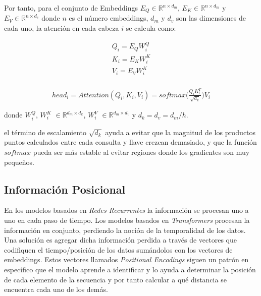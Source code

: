 Por tanto, para el conjunto de Embeddings  $E_Q \in \mathbb{R}^{n \times d_m}$,
$E_K \in \mathbb{R}^{n \times d_m}$ y $E_V \in \mathbb{R}^{n \times d_v}$ donde $n$ es el número
embeddings, $d_m$ y $d_v$ son las dimensiones de cada uno, la atención en cada cabeza $i$ se calcula
como:

\begin{equation}
    \begin{split}
        Q_i = E_Q W_i^Q\\
        K_i = E_K W_i^K\\
        V_i = E_V W_i^K\\
    \end{split}
\end{equation}

\begin{equation}
\begin{split}
    head_i = Attention(Q_i, K_i, V_i) = softmax\Big(\frac{Q_i K_i^T}{\sqrt{d_k}}\Big) V_i
    \label{eq:trans_att}
\end{split}
\end{equation}

donde $W_i^Q$, $W_i^K$ $\in \mathbb{R}^{d_m \times d_k}$, $W_i^V$ $\in \mathbb{R}^{d_m \times d_v}$
y $d_k=d_v=d_m/h$.

el término de escalamiento $\sqrt{d_k}$ ayuda a evitar que la magnitud de los productos puntos calculados
entre cada consulta y llave crezcan demasiado, y que la función $softmax$ pueda ser más estable al evitar
regiones donde los gradientes son muy pequeños\cite{Vaswani}.


\subsection{Información Posicional}

En los modelos basados en \textit{Redes Recurrentes} la información se procesan uno a uno en cada paso de
tiempo. Los modelos basados en \textit{Transformers} procesan la información en conjunto, perdiendo
la noción de la temporalidad de los datos. Una solución es agregar dicha información perdida a través
de vectores que codifiquen el tiempo/posición de los datos sumándolos con los vectores de embeddings.
Estos vectores llamados \textit{Positional Encodings} \cite{DBLP:journals/corr/GehringAGYD17} siguen
un patrón en específico
que el modelo aprende a identificar y lo ayuda a determinar la posición de cada elemento de la secuencia
y por tanto calcular a qué distancia se encuentra cada uno de los demás.

